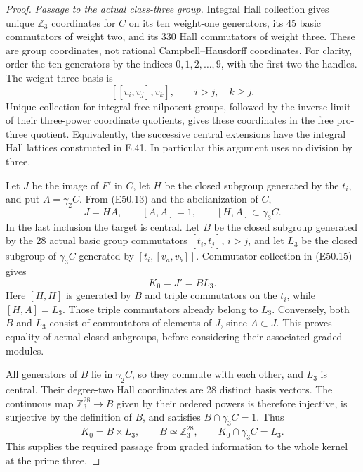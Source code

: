 \begin{proof}
\emph{Passage to the actual class-three group.}
Integral Hall collection gives unique
$\mathbb Z_3$ coordinates for $C$ on its
ten weight-one generators, its 45 basic
commutators of weight two, and its 330 Hall
commutators of weight three. These are
group coordinates, not rational
Campbell--Hausdorff coordinates. For clarity,
order the ten generators by the indices
$0,1,2,\ldots,9$, with the first two the
handles. The weight-three basis is
\[
 [[v_i,v_j],v_k],\qquad
        i>j,\quad k\ge j.
 \tag{E50.14}
\]
Unique collection for integral free
nilpotent groups, followed by the inverse
limit of their three-power coordinate
quotients, gives these coordinates in the
free pro-three quotient. Equivalently,
the successive central extensions have
the integral Hall lattices constructed
in E.41. In particular this argument
uses no division by three.

Let $J$ be the image of $F'$ in $C$, let
$H$ be the closed subgroup generated by
the $t_i$, and put $A=\gamma_2C$. From
(E50.13) and the abelianization of $C$,
\[
 J=H A,\qquad [A,A]=1,\qquad
                  [H,A]\subset\gamma_3C.
 \tag{E50.15}
\]
In the last inclusion the target is
central. Let $B$ be the closed subgroup
generated by the 28 actual basic group
commutators $[t_i,t_j]$, $i>j$, and let
$L_3$ be the closed subgroup of
$\gamma_3C$ generated by
$[t_i,[v_a,v_b]]$. Commutator collection
in (E50.15) gives
\[
 K_0=J'=B L_3.
 \tag{E50.16}
\]
Here $[H,H]$ is generated by $B$ and
triple commutators on the $t_i$, while
$[H,A]=L_3$. Those triple commutators
already belong to $L_3$. Conversely,
both $B$ and $L_3$ consist of commutators
of elements of $J$, since $A\subset J$.
This proves equality of actual closed
subgroups, before considering their
associated graded modules.

All generators of $B$ lie in $\gamma_2C$,
so they commute with each other, and
$L_3$ is central. Their degree-two Hall
coordinates are 28 distinct basis
vectors. The continuous map
$\mathbb Z_3^{28}\to B$ given by their
ordered powers is therefore injective,
is surjective by the definition of $B$,
and satisfies $B\cap\gamma_3C=1$.
Thus
\[
 K_0=B\times L_3,
 \qquad B\simeq\mathbb Z_3^{28},
 \qquad K_0\cap\gamma_3C=L_3.
 \tag{E50.17}
\]
This supplies the required passage from
graded information to the whole kernel
at the prime three.


\end{proof}
